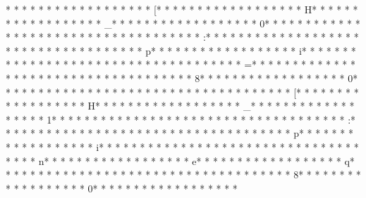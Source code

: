 * * *  * * *  * * *  *  * * *  *  * * *  * [* * *  * * *  * * *  *  * * *  *  * * *  * H* * *  * * *  * * *  *  * * *  *  * * *  * _* * *  * * *  * * *  *  * * *  *  * * *  * 0* * *  * * *  * * *  *  * * *  *  * * *  *  * * *  * * *  * * *  *  * * *  *  * * *  * :* * *  * * *  * * *  *  * * *  *  * * *  *  * * *  * * *  * * *  *  * * *  *  * * *  * p* * *  * * *  * * *  *  * * *  *  * * *  * i* * *  * * *  * * *  *  * * *  *  * * *  *  * * *  * * *  * * *  *  * * *  *  * * *  * =* * *  * * *  * * *  *  * * *  *  * * *  *  * * *  * * *  * * *  *  * * *  *  * * *  * 8* * *  * * *  * * *  *  * * *  *  * * *  * 0* * *  * * *  * * *  *  * * *  *  * * *  * %
* * *  * * *  * * *  *  * * *  *  * * *  * [* * *  * * *  * * *  *  * * *  *  * * *  * H* * *  * * *  * * *  *  * * *  *  * * *  * _* * *  * * *  * * *  *  * * *  *  * * *  * 1* * *  * * *  * * *  *  * * *  *  * * *  *  * * *  * * *  * * *  *  * * *  *  * * *  * :* * *  * * *  * * *  *  * * *  *  * * *  *  * * *  * * *  * * *  *  * * *  *  * * *  * p* * *  * * *  * * *  *  * * *  *  * * *  * i* * *  * * *  * * *  *  * * *  *  * * *  *  * * *  * * *  * * *  *  * * *  *  * * *  * n* * *  * * *  * * *  *  * * *  *  * * *  * e* * *  * * *  * * *  *  * * *  *  * * *  * q* * *  * * *  * * *  *  * * *  *  * * *  *  * * *  * * *  * * *  *  * * *  *  * * *  * 8* * *  * * *  * * *  *  * * *  *  * * *  * 0* * *  * * *  * * *  *  * * *  *  * * *  * %
